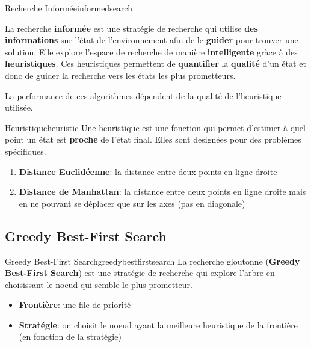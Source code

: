 \begin{definition}{Recherche Informée}{informedsearch}

    La recherche \textbf{informée} est une stratégie de recherche qui utilise \textbf{des informations} sur l'état de l'environnement afin de le \textbf{guider} pour trouver une solution.
    Elle explore l'espace de recherche de manière \textbf{intelligente} gràce à des \textbf{heuristiques}. 
    Ces heuristiques permettent de \textbf{quantifier} la \textbf{qualité} d'un état et donc 
    de guider la recherche vers les états les plus prometteurs.
\end{definition}

\begin{remark}\leavevmode
    La performance de ces algorithmes dépendent de la qualité de l'heuristique utilisée.
\end{remark}

\begin{definition}{Heuristique}{heuristic}
    Une heuristique est une fonction qui permet d'estimer à quel point un état est \textbf{proche}
    de l'état final. Elles sont designées pour des problèmes spécifiques.
\end{definition}

\begin{examples}\leavevmode
    \begin{enumerate}
        \item \textbf{Distance Euclidéenne}: la distance entre deux points 
            en ligne droite 
        \item \textbf{Distance de Manhattan}: la distance entre deux points 
            en ligne droite mais en ne pouvant se déplacer que sur les axes 
            (pas en diagonale) 
    \end{enumerate}
\end{examples}


\subsection{Greedy Best-First Search} %
\label{sub:greedy_best_first_search}

\begin{definition}{Greedy Best-First Search}{greedybestfirstsearch}
    La recherche gloutonne (\textbf{Greedy Best-First Search}) est une stratégie de recherche qui explore l'arbre en choisissant le noeud qui semble le plus prometteur.
    \begin{itemize}
        \item \textbf{Frontière}: une file de priorité
        \item \textbf{Stratégie}: on choisit le noeud ayant la meilleure heuristique de la frontière (en  fonction de la stratégie)
    \end{itemize} 
\end{definition}

